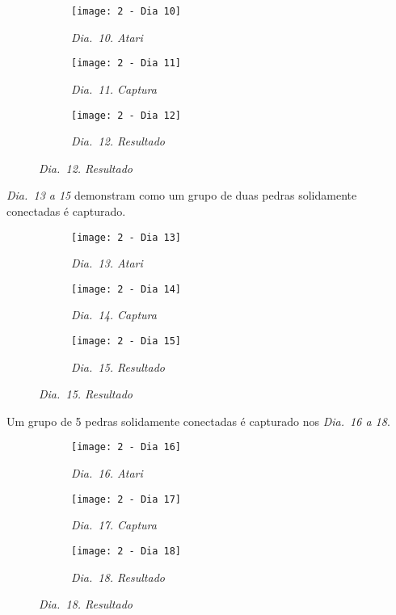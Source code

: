 \begin{figure}[h]
    \centering
    \begin{subfigure}{.3\textwidth}
        \centering
        \texttt{[image: 2 - Dia 10]}
        \caption*{\emph{Dia.\@~10. Atari}}
    \end{subfigure}
    \begin{subfigure}{.3\textwidth}
        \centering
        \texttt{[image: 2 - Dia 11]}
        \caption*{\emph{Dia.\@~11. Captura}}
    \end{subfigure}
    \begin{subfigure}{.3\textwidth}
        \centering
        \texttt{[image: 2 - Dia 12]}
        \caption*{\emph{Dia.\@~12. Resultado}}
    \end{subfigure}
\end{figure}

\pagebreak

\emph{Dia.\@~13 a 15} demonstram  como um grupo de duas pedras solidamente conectadas é capturado.

\begin{figure}[h]
    \centering
    \begin{subfigure}{.3\textwidth}
        \centering
        \texttt{[image: 2 - Dia 13]}
        \caption*{\emph{Dia.\@~13. Atari}}
    \end{subfigure}
    \begin{subfigure}{.3\textwidth}
        \centering
        \texttt{[image: 2 - Dia 14]}
        \caption*{\emph{Dia.\@~14. Captura}}
    \end{subfigure}
    \begin{subfigure}{.3\textwidth}
        \centering
        \texttt{[image: 2 - Dia 15]}
        \caption*{\emph{Dia.\@~15. Resultado}}
    \end{subfigure}
\end{figure}

Um grupo de 5 pedras solidamente conectadas é capturado nos \emph{Dia.\@~16 a 18}.

\begin{figure}[h!]
    \centering
    \begin{subfigure}{.3\textwidth}
        \centering
        \texttt{[image: 2 - Dia 16]}
        \caption*{\emph{Dia.\@~16. Atari}}
    \end{subfigure}
    \begin{subfigure}{.3\textwidth}
        \centering
        \texttt{[image: 2 - Dia 17]}
        \caption*{\emph{Dia.\@~17. Captura}}
    \end{subfigure}
    \begin{subfigure}{.3\textwidth}
        \centering
        \texttt{[image: 2 - Dia 18]}
        \caption*{\emph{Dia.\@~18. Resultado}}
    \end{subfigure}
\end{figure}

